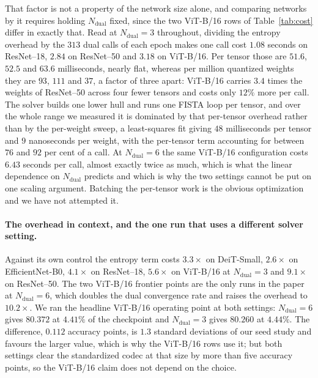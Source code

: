 \documentclass{article}
\begin{document}
That factor is not a property of the network size alone, and comparing networks
by it requires holding $N_{\mathrm{dual}}$ fixed, since the two ViT-B/16 rows of
Table~\ref{tab:cost} differ in exactly that. Read at $N_{\mathrm{dual}}=3$
throughout, dividing the entropy overhead by the $313$ dual calls of each epoch
makes one call cost $1.08$ seconds on ResNet--18, $2.84$ on ResNet--50 and $3.18$
on ViT-B/16. Per tensor those are $51.6$, $52.5$ and $63.6$ milliseconds, nearly
flat, whereas per million quantized weights they are $93$, $111$ and $37$, a
factor of three apart: ViT-B/16 carries $3.4$ times the weights of ResNet--50
across four fewer tensors and costs only $12\%$ more per call. The solver builds
one lower hull and runs one FISTA loop per tensor, and over the whole range we
measured it is dominated by that per-tensor overhead rather than by the per-weight
sweep, a least-squares fit giving $48$ milliseconds per tensor and $9$ nanoseconds
per weight, with the per-tensor term accounting for between $76$ and $92$ per cent
of a call. At $N_{\mathrm{dual}}=6$ the same ViT-B/16 configuration costs $6.43$
seconds per call, almost exactly twice as much, which is what the linear dependence
on $N_{\mathrm{dual}}$ predicts and which is why the two settings cannot be put on
one scaling argument. Batching the per-tensor work is the obvious optimization and
we have not attempted it.

\paragraph{The overhead in context, and the one run that uses a different solver
setting.} Against its own control the entropy term costs $3.3\times$ on
DeiT-Small, $2.6\times$ on EfficientNet-B0, $4.1\times$ on ResNet--18,
$5.6\times$ on ViT-B/16 at $N_{\mathrm{dual}}=3$ and $9.1\times$ on ResNet--50.
The two ViT-B/16 frontier points are the only runs in the paper at
$N_{\mathrm{dual}}=6$, which doubles the dual convergence rate and raises the
overhead to $10.2\times$. We ran the headline ViT-B/16 operating point at both
settings: $N_{\mathrm{dual}}=6$ gives $80.372$ at $4.41\%$ of the checkpoint and
$N_{\mathrm{dual}}=3$ gives $80.260$ at $4.44\%$. The difference, $0.112$
accuracy points, is $1.3$ standard deviations of our seed study and favours the
larger value, which is why the ViT-B/16 rows use it; but both settings clear the
standardized codec at that size by more than five accuracy points, so the ViT-B/16
claim does not depend on the choice.
\end{document}
